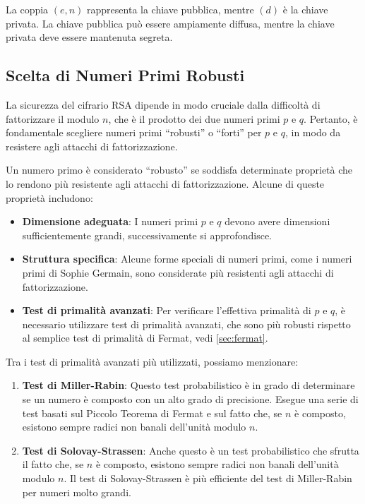 \documentclass[a4paper,12pt]{report}
\begin{document}
La coppia $(e, n)$ rappresenta la chiave pubblica, mentre $(d)$ è la chiave privata. La chiave pubblica può essere ampiamente diffusa, mentre la chiave privata deve essere mantenuta segreta.

\subsection*{Scelta di Numeri Primi Robusti}
La sicurezza del cifrario RSA dipende in modo cruciale dalla difficoltà di fattorizzare il modulo $n$, che è il prodotto dei due numeri primi $p$ e $q$. Pertanto, è fondamentale scegliere numeri primi ``robusti'' o ``forti'' per $p$ e $q$, in modo da resistere agli attacchi di fattorizzazione.

Un numero primo è considerato ``robusto'' se soddisfa determinate proprietà che lo rendono più resistente agli attacchi di fattorizzazione. Alcune di queste proprietà includono:

\begin{itemize}
    \item \textbf{Dimensione adeguata}: I numeri primi $p$ e $q$ devono avere dimensioni sufficientemente grandi, successivamente si approfondisce.
    \item \textbf{Struttura specifica}: Alcune forme speciali di numeri primi, come i numeri primi di Sophie Germain, sono considerate più resistenti agli attacchi di fattorizzazione.
    \item \textbf{Test di primalità avanzati}: Per verificare l'effettiva primalità di $p$ e $q$, è necessario utilizzare test di primalità avanzati, che sono più robusti rispetto al semplice test di primalità di Fermat, vedi \ref{sec:fermat}.
\end{itemize}

Tra i test di primalità avanzati più utilizzati, possiamo menzionare:

\begin{enumerate}
    \item \textbf{Test di Miller-Rabin}: Questo test probabilistico è in grado di determinare se un numero è composto con un alto grado di precisione. Esegue una serie di test basati sul Piccolo Teorema di Fermat e sul fatto che, se $n$ è composto, esistono sempre radici non banali dell'unità modulo $n$.
    \item \textbf{Test di Solovay-Strassen}: Anche questo è un test probabilistico che sfrutta il fatto che, se $n$ è composto, esistono sempre radici non banali dell'unità modulo $n$. Il test di Solovay-Strassen è più efficiente del test di Miller-Rabin per numeri molto grandi.
\end{enumerate}
\end{document}
